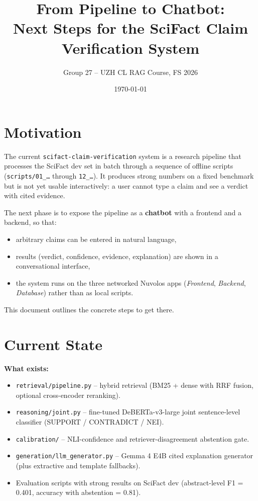 \documentclass[11pt,a4paper]{article}
\title{From Pipeline to Chatbot:\\
       Next Steps for the SciFact Claim Verification System}
\author{Group 27 -- UZH CL RAG Course, FS 2026}
\date{\today}
\begin{document}
\maketitle

\section{Motivation}

The current \texttt{scifact-claim-verification} system is a research pipeline
that processes the SciFact dev set in batch through a sequence of offline
scripts (\texttt{scripts/01\_\ldots{}} through \texttt{12\_\ldots{}}). It
produces strong numbers on a fixed benchmark but is not yet usable
interactively: a user cannot type a claim and see a verdict with cited
evidence.

The next phase is to expose the pipeline as a \textbf{chatbot} with a
frontend and a backend, so that:

\begin{itemize}
  \item arbitrary claims can be entered in natural language,
  \item results (verdict, confidence, evidence, explanation) are shown in a
        conversational interface,
  \item the system runs on the three networked Nuvolos apps
        (\textit{Frontend}, \textit{Backend}, \textit{Database}) rather
        than as local scripts.
\end{itemize}

This document outlines the concrete steps to get there.

\section{Current State}

\textbf{What exists:}
\begin{itemize}
  \item \texttt{retrieval/pipeline.py} -- hybrid retrieval (BM25 + dense
        with RRF fusion, optional cross-encoder reranking).
  \item \texttt{reasoning/joint.py} -- fine-tuned DeBERTa-v3-large joint
        sentence-level classifier (SUPPORT / CONTRADICT / NEI).
  \item \texttt{calibration/} -- NLI-confidence and retriever-disagreement
        abstention gate.
  \item \texttt{generation/llm\_generator.py} -- Gemma 4 E4B cited
        explanation generator (plus extractive and template fallbacks).
  \item Evaluation scripts with strong results on SciFact dev
        (abstract-level F1 = 0.401, accuracy with abstention = 0.81).
\end{itemize}
\end{document}
